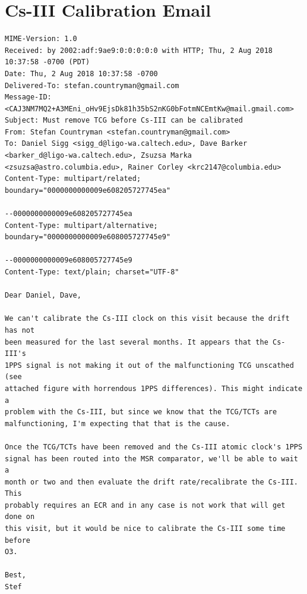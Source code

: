 \documentclass{article}
\begin{document}
\clearpage
\section{Cs-III Calibration Email}
\label{sec:cesiumemail}
\lstset{language=}
\begin{lstlisting}
MIME-Version: 1.0
Received: by 2002:adf:9ae9:0:0:0:0:0 with HTTP; Thu, 2 Aug 2018 10:37:58 -0700 (PDT)
Date: Thu, 2 Aug 2018 10:37:58 -0700
Delivered-To: stefan.countryman@gmail.com
Message-ID: <CAJ3NM7MQ2+A3MEni_oHv9EjsDk81h35bS2nKG0bFotmNCEmtKw@mail.gmail.com>
Subject: Must remove TCG before Cs-III can be calibrated
From: Stefan Countryman <stefan.countryman@gmail.com>
To: Daniel Sigg <sigg_d@ligo-wa.caltech.edu>, Dave Barker <barker_d@ligo-wa.caltech.edu>, Zsuzsa Marka <zsuzsa@astro.columbia.edu>, Rainer Corley <krc2147@columbia.edu>
Content-Type: multipart/related; boundary="0000000000009e608205727745ea"

--0000000000009e608205727745ea
Content-Type: multipart/alternative; boundary="0000000000009e608005727745e9"

--0000000000009e608005727745e9
Content-Type: text/plain; charset="UTF-8"

Dear Daniel, Dave,

We can't calibrate the Cs-III clock on this visit because the drift has not
been measured for the last several months. It appears that the Cs-III's
1PPS signal is not making it out of the malfunctioning TCG unscathed (see
attached figure with horrendous 1PPS differences). This might indicate a
problem with the Cs-III, but since we know that the TCG/TCTs are
malfunctioning, I'm expecting that that is the cause.

Once the TCG/TCTs have been removed and the Cs-III atomic clock's 1PPS
signal has been routed into the MSR comparator, we'll be able to wait a
month or two and then evaluate the drift rate/recalibrate the Cs-III. This
probably requires an ECR and in any case is not work that will get done on
this visit, but it would be nice to calibrate the Cs-III some time before
O3.

Best,
Stef
\end{lstlisting}

\clearpage
\end{document}
